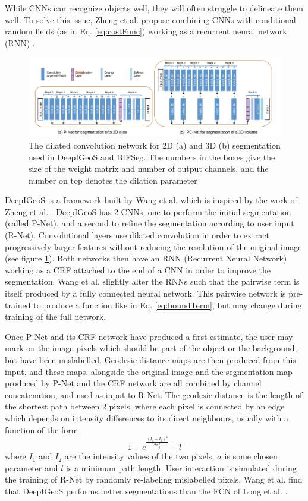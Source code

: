 While CNNs can recognize objects well, they will often struggle to delineate them well. To solve this issue, Zheng et al. propose combining CNNs with conditional random fields (as in Eq. \ref{eq:costFunc}) working as a recurrent neural network (RNN) \cite{crfAsRNN}. 

\begin{figure}[h!]
\centering
\includegraphics[scale=0.45]{pictures/P-Net}
\caption{The dilated convolution network for 2D (a) and 3D (b) segmentation used in DeepIGeoS and BIFSeg. The numbers in the boxes give the size of the weight matrix and number of output channels, and the number on top denotes the dilation parameter \cite{deepIGeoS}}
\label{fig:p-net}
\end{figure}

DeepIGeoS is a framework built by Wang et al. which is inspired by the work of Zheng et al. \cite{deepIGeoS}. DeepIGeoS has 2 CNNs, one to perform the initial segmentation (called P-Net), and a second to refine the segmentation according to user input (R-Net). Convolutional layers use dilated convolution in order to extract progressively larger features without reducing the resolution of the original image (see figure \ref{fig:p-net}). Both networks then have an RNN (Recurrent Neural Network) working as a CRF attached to the end of a CNN in order to improve the segmentation. Wang et al. slightly alter the RNNs such that the pairwise term is itself produced by a fully connected neural network. This pairwise network is pre-trained to produce a function like in Eq. \ref{eq:boundTerm}, but may change during training of the full network. 

Once P-Net and its CRF network have produced a first estimate, the user may mark on the image pixels which should be part of the object or the background, but have been mislabelled. Geodesic distance maps are then produced from this input, and these maps, alongside the original image and the segmentation map produced by P-Net and the CRF network are all combined by channel concatenation, and used as input to R-Net. The geodesic distance is the length of the shortest path between 2 pixels, where each pixel is connected by an edge which depends on intensity differences to its direct neighbours, usually with a function of the form
\begin{equation}
1 - e^{\frac{(I_1 - I_2)^2}{2 \sigma_{g}^{2}}} + l
\label{eq:geodesic}
\end{equation}
where $I_1$ and $I_2$ are the intensity values of the two pixels, $\sigma$ is some chosen parameter and $l$ is a minimum path length.
User interaction is simulated during the training of R-Net by randomly re-labeling mislabelled pixels. Wang et al. find that DeepIGeoS performs better segmentations than the FCN of Long et al. \cite{fcn}. 
